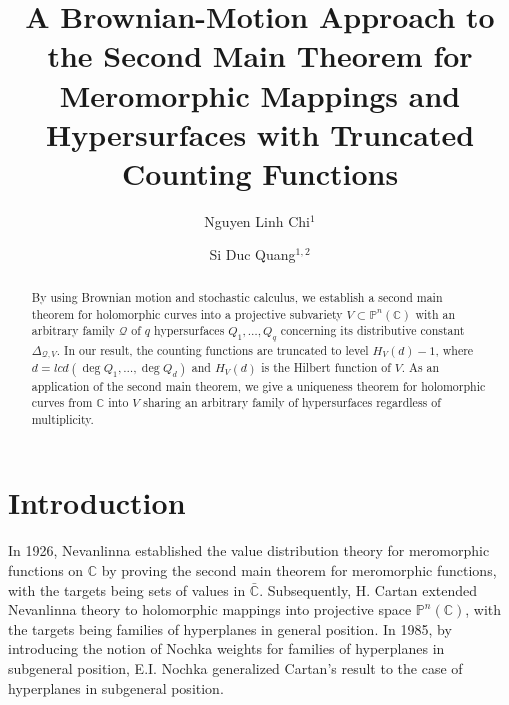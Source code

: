\documentclass[12pt]{amsart}
\newcommand{\C}{{\mathbb{C}}}
\renewcommand{\P}{{\mathbb{P}}}
\begin{document}
\title[A Brownian-Motion Approach to the Second Main Theorem]{A Brownian-Motion Approach to the Second Main Theorem for Meromorphic Mappings and Hypersurfaces with Truncated Counting Functions} 

\author{Nguyen Linh Chi$^1$}
\author{Si Duc Quang$^{1,2}$}
\address{$^1$Department of Mathematics, Hanoi National University of Education, 136-Xuan Thuy, Cau Giay, Hanoi, Vietnam}
\address{$^2$Institute of Natural Sciences, Hanoi National University of Education, 136-Xuan Thuy, Cau Giay, Hanoi, Vietnam}

\begin{abstract}
By using Brownian motion and stochastic calculus, we establish a second main theorem for holomorphic curves into a projective subvariety $V\subset\P^n(\C)$ with an arbitrary family $\mathcal Q$ of $q$ hypersurfaces $Q_1,\ldots,Q_q$ concerning its distributive constant $\Delta_{\mathcal Q,V}$. In our result, the counting functions are truncated to level $H_V(d)-1$, where $d=lcd(\deg Q_1,\ldots,\deg Q_d)$ and $H_V(d)$ is the Hilbert function of $V$. As an application of the second main theorem, we give a uniqueness theorem for holomorphic curves from $\C$ into $V$ sharing an arbitrary family of hypersurfaces regardless of multiplicity. 
\end{abstract}

\maketitle

\def\thefootnote{\empty}

\section{Introduction}

In 1926, Nevanlinna \cite{N} established the value distribution theory for meromorphic functions on $\C$ by proving the second main theorem for meromorphic functions, with the targets being sets of values in $\bar{\C}$. Subsequently, H. Cartan \cite{C}  extended Nevanlinna theory to holomorphic mappings into projective space $\P^n(\C)$, with the targets being families of hyperplanes in general position. In 1985, by introducing the notion of Nochka weights for families of hyperplanes in subgeneral position, E.I. Nochka \cite{Nochka} generalized Cartan's result to the case of hyperplanes in subgeneral position.
\end{document}
